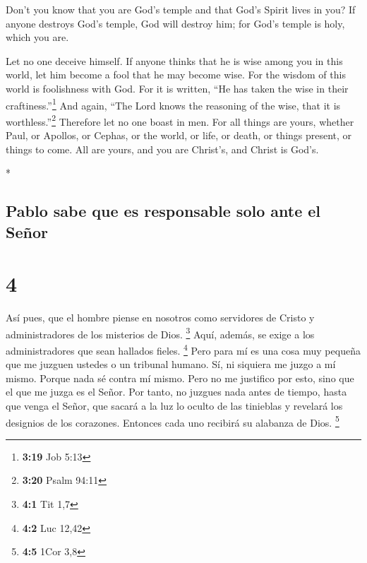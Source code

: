 \begin{paracol}{2}
\begin{otherlanguage}{english}
 Don't you know that you are God's temple and that God's
Spirit lives in you?  If anyone destroys God's temple,
God will destroy him; for God's temple is holy, which you are.

 Let no one deceive himself. If anyone thinks that he is
wise among you in this world, let him become a fool that he may become
wise.  For the wisdom of this world is foolishness with
God. For it is written, ``He has taken the wise in their
craftiness.''\footnote{\textbf{3:19} Job 5:13}  And
again, ``The Lord knows the reasoning of the wise, that it is
worthless.''\footnote{\textbf{3:20} Psalm 94:11} 
Therefore let no one boast in men. For all things are yours,
 whether Paul, or Apollos, or Cephas, or the world, or
life, or death, or things present, or things to come. All are yours,
 and you are Christ's, and Christ is God's.

\end{otherlanguage}

\switchcolumn[0]*

\hypertarget{pablo-sabe-que-es-responsable-solo-ante-el-seuxf1or}{%
\subsection{Pablo sabe que es responsable solo ante el
Señor}\label{pablo-sabe-que-es-responsable-solo-ante-el-seuxf1or}}

\hypertarget{section-6}{%
\section{4}\label{section-6}}

 Así pues, que el hombre piense en nosotros como
servidores de Cristo y administradores de los misterios de Dios.
\footnote{\textbf{4:1} Tit 1,7}  Aquí, además, se exige a
los administradores que sean hallados fieles. \footnote{\textbf{4:2} Luc
  12,42}  Pero para mí es una cosa muy pequeña que me
juzguen ustedes o un tribunal humano. Sí, ni siquiera me juzgo a mí
mismo.  Porque nada sé contra mí mismo. Pero no me
justifico por esto, sino que el que me juzga es el Señor. 
Por tanto, no juzgues nada antes de tiempo, hasta que venga el Señor,
que sacará a la luz lo oculto de las tinieblas y revelará los designios
de los corazones. Entonces cada uno recibirá su alabanza de Dios.
\footnote{\textbf{4:5} 1Cor 3,8}


\end{paracol}
